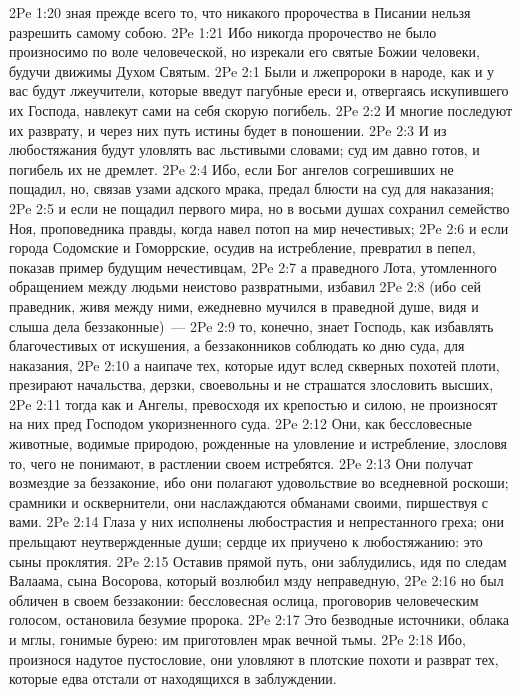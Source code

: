 \vs 2Pe 1:20 зная прежде всего то, что никакого пророчества в Писании нельзя разрешить самому собою.
\vs 2Pe 1:21 Ибо никогда пророчество не было произносимо по воле человеческой, но изрекали его святые Божии человеки, будучи движимы Духом Святым.
\vs 2Pe 2:1 Были и лжепророки в народе, как и у вас будут лжеучители, которые введут пагубные ереси и, отвергаясь искупившего их Господа, навлекут сами на себя скорую погибель.
\vs 2Pe 2:2 И многие последуют их разврату, и через них путь истины будет в поношении.
\vs 2Pe 2:3 И из любостяжания будут уловлять вас льстивыми словами; суд им давно готов, и погибель их не дремлет.
\vs 2Pe 2:4 Ибо, если Бог ангелов согрешивших не пощадил, но, связав узами адского мрака, предал блюсти на суд для наказания;
\vs 2Pe 2:5 и если не пощадил первого мира, но в восьми душах сохранил семейство Ноя, проповедника правды, когда навел потоп на мир нечестивых;
\vs 2Pe 2:6 и если города Содомские и Гоморрские, осудив на истребление, превратил в пепел, показав пример будущим нечестивцам,
\vs 2Pe 2:7 а праведного Лота, утомленного обращением между людьми неистово развратными, избавил
\vs 2Pe 2:8 (ибо сей праведник, живя между ними, ежедневно мучился в праведной душе, видя и слыша дела беззаконные)~---
\vs 2Pe 2:9 то, конечно, знает Господь, как избавлять благочестивых от искушения, а беззаконников соблюдать ко дню суда, для наказания,
\vs 2Pe 2:10 а наипаче тех, которые идут вслед скверных похотей плоти, презирают начальства, дерзки, своевольны и не страшатся злословить высших,
\vs 2Pe 2:11 тогда как и Ангелы, превосходя их крепостью и силою, не произносят на них пред Господом укоризненного суда.
\vs 2Pe 2:12 Они, как бессловесные животные, водимые природою, рожденные на уловление и истребление, злословя то, чего не понимают, в растлении своем истребятся.
\vs 2Pe 2:13 Они получат возмездие за беззаконие, ибо они полагают удовольствие во вседневной роскоши; срамники и осквернители, они наслаждаются обманами своими, пиршествуя с вами.
\vs 2Pe 2:14 Глаза у них исполнены любострастия и непрестанного греха; они прельщают неутвержденные души; сердце их приучено к любостяжанию: это сыны проклятия.
\vs 2Pe 2:15 Оставив прямой путь, они заблудились, идя по следам Валаама, сына Восорова, который возлюбил мзду неправедную,
\vs 2Pe 2:16 но был обличен в своем беззаконии: бессловесная ослица, проговорив человеческим голосом, остановила безумие пророка.
\vs 2Pe 2:17 Это безводные источники, облака и мглы, гонимые бурею: им приготовлен мрак вечной тьмы.
\vs 2Pe 2:18 Ибо, произнося надутое пустословие, они уловляют в плотские похоти и разврат тех, которые едва отстали от находящихся в заблуждении.
